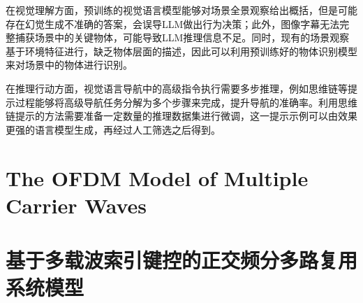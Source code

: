 \documentclass[bachelor]{thesis-uestc}
\begin{document}
在视觉理解方面，预训练的视觉语言模型能够对场景全景观察给出概括，但是可能存在幻觉生成不准确的答案，会误导LLM做出行为决策；此外，图像字幕无法完整捕获场景中的关键物体，可能导致LLM推理信息不足。同时，现有的场景观察基于环境特征进行，缺乏物体层面的描述，因此可以利用预训练好的物体识别模型来对场景中的物体进行识别。

在推理行动方面，视觉语言导航中的高级指令执行需要多步推理，例如思维链等提示过程能够将高级导航任务分解为多个步骤来完成，提升导航的准确率。利用思维链提示的方法需要准备一定数量的推理数据集进行微调，这一提示示例可以由效果更强的语言模型生成，再经过人工筛选之后得到。



%
% 
%
% 
% 
%



\thesistranslationoriginal
\section{The OFDM Model of Multiple Carrier Waves}

\thesistranslationchinese
\section{基于多载波索引键控的正交频分多路复用系统模型}
\end{document}
